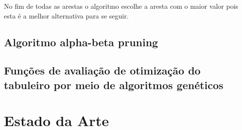 No fim de todas as arestas o algoritmo escolhe a aresta com o maior valor pois esta é a melhor alternativa para se seguir.

\subsection{Algoritmo alpha-beta pruning}

\subsection{Funções de avaliação de otimização do tabuleiro por meio de algoritmos genéticos}

\section{Estado da Arte}

